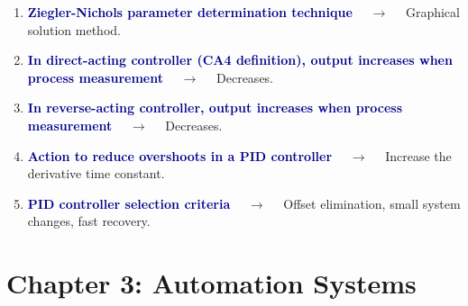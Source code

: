 \documentclass[11pt,a4paper]{article}
\begin{document}
\begin{enumerate}[label=\arabic*., leftmargin=*, labelsep=0.8em, itemsep=0.35em, parsep=0.1em, topsep=0.2em]
  \item \textcolor{darkblue}{\textbf{Ziegler-Nichols parameter determination technique}} $\quad\to\quad$ Graphical solution method.
  \item \textcolor{darkblue}{\textbf{In direct-acting controller (CA4 definition), output increases when process measurement}} $\quad\to\quad$ Decreases.
  \item \textcolor{darkblue}{\textbf{In reverse-acting controller, output increases when process measurement}} $\quad\to\quad$ Decreases.
  \item \textcolor{darkblue}{\textbf{Action to reduce overshoots in a PID controller}} $\quad\to\quad$ Increase the derivative time constant.
  \item \textcolor{darkblue}{\textbf{PID controller selection criteria}} $\quad\to\quad$ Offset elimination, small system changes, fast recovery.
\end{enumerate}

\section*{Chapter 3: Automation Systems}
\end{document}
